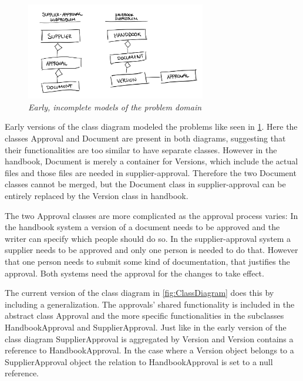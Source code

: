\begin{figure}[H]
	\centering
	\includegraphics[width=0.7\textwidth]{billeder/pseudoClassDiagram.jpg}
	\caption{\textit{Early, incomplete models of the problem domain
	}\label{fig:PseudoClassDiagram}}
\end{figure}

Early versions of the class diagram modeled the problems like seen in \cref{fig:PseudoClassDiagram}.
Here the classes Approval and Document are present in both diagrams, suggesting that their functionalities are too similar to have separate classes. However in the handbook, Document is merely a container for Versions, which include the actual files and those files are needed in supplier-approval. Therefore the two Document classes cannot be merged, but the Document class in supplier-approval can be entirely replaced by the Version class in handbook.

The two Approval classes are more complicated as the approval process varies:
In the handbook system a version of a document needs to be approved and the writer can specify which people should do so.
In the supplier-approval system a supplier needs to be approved and only one person is needed to do that.
However that one person needs to submit some kind of documentation, that justifies the approval.
Both systems need the approval for the changes to take effect.

The current version of the class diagram in \cref{fig:ClassDiagram} does this by including a generalization. The approvals' shared functionality is included in the abstract class Approval and the more specific functionalities in the subclasses HandbookApproval and SupplierApproval.
Just like in the early version of the class diagram SupplierApproval is aggregated by Version and Version contains a reference to HandbookApproval.
In the case where a Version object belongs to a SupplierApproval object the relation to HandbookApproval is set to a null reference.

